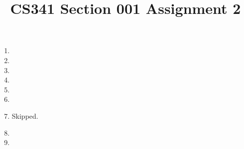 \documentclass[12pt]{article}
\title{CS341 Section 001 Assignment 2}
\begin{document}
\maketitle

\begin{enumerate}
\item
\item
\item
\item
\item
\item
\item Skipped.
\item
\item
\end{enumerate}
\end{document}
